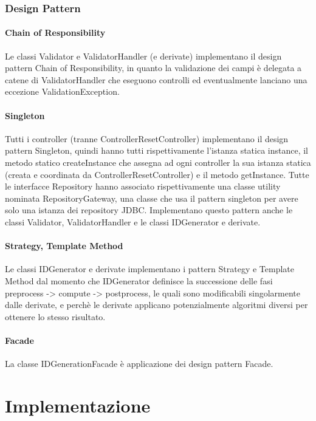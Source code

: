 \documentclass[a4paper,12pt]{report}
\begin{document}
		
		\subsection{Design Pattern}
			\subsubsection{Chain of Responsibility}
			Le classi Validator e ValidatorHandler (e derivate) implementano il design pattern Chain of Responsibility, in quanto la validazione dei campi è delegata a catene di ValidatorHandler che eseguono controlli ed eventualmente lanciano una eccezione ValidationException.
		
			\subsubsection{Singleton}	
			Tutti i controller (tranne ControllerResetController) implementano il design pattern Singleton, quindi hanno tutti rispettivamente l'istanza statica instance, il metodo statico createInstance che assegna ad ogni controller la sua istanza statica (creata e coordinata da ControllerResetController) e il metodo getInstance.
Tutte le interfacce Repository hanno associato rispettivamente una classe utility nominata RepositoryGateway, una classe che usa il pattern singleton per avere solo una istanza dei repository JDBC.
Implementano questo pattern anche le classi Validator, ValidatorHandler e le classi IDGenerator e derivate. 
				
		\subsubsection{Strategy, Template Method}
		Le classi IDGenerator e derivate implementano i pattern Strategy e Template Method dal momento che IDGenerator definisce la successione delle fasi preprocess -> compute -> postprocess, le quali sono modificabili singolarmente dalle derivate, e perchè le derivate applicano potenzialmente algoritmi diversi per ottenere lo stesso risultato. 
		
		\subsubsection{Facade}		
		La classe IDGenerationFacade è applicazione dei design pattern Facade.

      \chapter{Implementazione}
      
\end{document}
